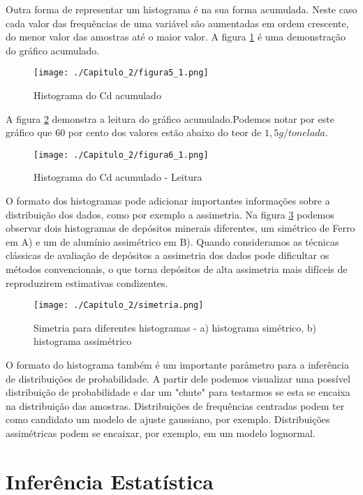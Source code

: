 Outra forma de representar um histograma é na sua forma acumulada. Neste caso cada valor das frequências de uma variável são aumentadas em ordem crescente, do menor valor das amostras até o maior valor. A figura \ref{Fig5_1} é uma demonstração do gráfico acumulado. 

\FloatBarrier
\begin{figure}[!htb]
\centering
\texttt{[image: ./Capitulo\_2/figura5\_1.png]}	
\caption{Histograma do Cd acumulado}
\label{Fig5_1}
\end{figure}
\FloatBarrier

A figura \ref{Fig6_1} demonstra a leitura do gráfico acumulado.Podemos notar por este gráfico que 60 por cento dos valores estão abaixo do teor de $1,5 g/tonelada$.  

\FloatBarrier
\begin{figure}[!htb]
	\centering
	\texttt{[image: ./Capitulo\_2/figura6\_1.png]}	
	\caption{Histograma do Cd acumulado - Leitura}
	\label{Fig6_1}
\end{figure}
\FloatBarrier

O formato dos histogramas pode adicionar importantes informações sobre a distribuição dos dados, como por exemplo a assimetria. Na figura \ref{Fig_simetric} podemos observar dois histogramas de depósitos minerais diferentes, um simétrico de Ferro em A) e um de alumínio assimétrico em B). Quando consideramos as técnicas clássicas de avaliação de depósitos a assimetria dos dados pode dificultar os métodos convencionais, o que torna depósitos de alta assimetria mais difíceis de reproduzirem estimativas condizentes.


\FloatBarrier
\begin{figure}[!htb]
	\centering
	\texttt{[image: ./Capitulo\_2/simetria.png]}	
	\caption{Simetria para diferentes histogramas - a) histograma simétrico, b) histograma assimétrico}
	\label{Fig_simetric}
\end{figure}
\FloatBarrier

O formato do histograma também é um importante parâmetro para a inferência de distribuições de probabilidade. A partir dele podemos visualizar uma possível distribuição de probabilidade e dar um "chute" para testarmos se esta se encaixa na distribuição das amostras. Distribuições de frequências centradas podem ter como candidato um modelo de ajuste gaussiano, por exemplo. Distribuições assimétricas podem se encaixar, por exemplo, em um modelo lognormal.


\section {Inferência Estatística}

